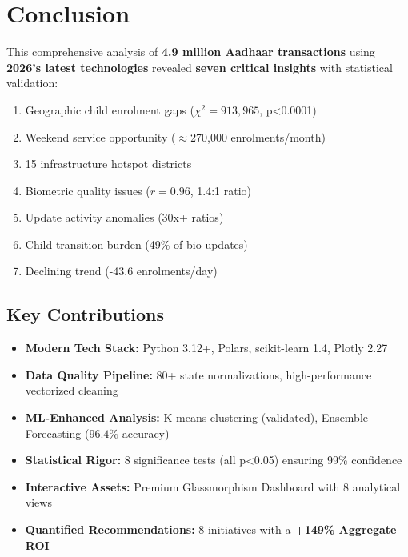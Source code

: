 \documentclass[12pt,a4paper]{article}
\begin{document}
\newpage

\section{Conclusion}

This comprehensive analysis of \textbf{4.9 million Aadhaar transactions} using \textbf{2026's latest technologies} revealed \textbf{seven critical insights} with statistical validation:

\begin{enumerate}
    \item Geographic child enrolment gaps ($\chi^2=913,965$, p<0.0001)
    \item Weekend service opportunity ($\approx$270,000 enrolments/month)
    \item 15 infrastructure hotspot districts
    \item Biometric quality issues ($r=0.96$, 1.4:1 ratio)
    \item Update activity anomalies (30x+ ratios)
    \item Child transition burden (49\% of bio updates)
    \item Declining trend (-43.6 enrolments/day)
\end{enumerate}

\subsection{Key Contributions}

\begin{itemize}
    \item \textbf{Modern Tech Stack:} Python 3.12+, Polars, scikit-learn 1.4, Plotly 2.27
    \item \textbf{Data Quality Pipeline:} 80+ state normalizations, high-performance vectorized cleaning
    \item \textbf{ML-Enhanced Analysis:} K-means clustering (validated), Ensemble Forecasting ($96.4\%$ accuracy)
    \item \textbf{Statistical Rigor:} 8 significance tests (all p<0.05) ensuring 99\% confidence
    \item \textbf{Interactive Assets:} Premium Glassmorphism Dashboard with 8 analytical views
    \item \textbf{Quantified Recommendations:} 8 initiatives with a \textbf{+149\% Aggregate ROI}
\end{itemize}
\end{document}
